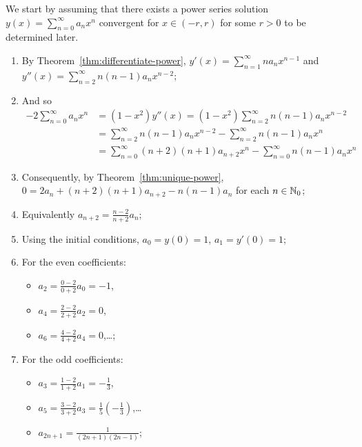\begin{solution}

  We start by assuming that there exists a power series solution \(y(x) = \sum_{n=0}^{\infty}a_n x^n\) convergent for \(x \in (-r,r)\) for some \(r>0\) to be determined later.
  \begin{enumerate}
    \item
          By Theorem~\ref{thm:differentiate-power}, \(y'(x) = \sum_{n=1}^{\infty}n a_n x^{n-1}\) and \(y''(x) = \sum_{n=2}^{\infty}n(n-1) a_n x^{n-2}\);
    \item And so
          \[
            \begin{aligned}
              -2 \sum_{n=0}^{\infty}a_n x^n
               & = (1-x^2)y''(x)
              = (1-x^2) \sum_{n=2}^{\infty}n(n-1) a_n x^{n-2}                                        \\
               & = \sum_{n=2}^{\infty}n(n-1) a_n x^{n-2} - \sum_{n=2}^{\infty}n(n-1) a_n x^{n}       \\
               & = \sum_{n=0}^{\infty}(n+2)(n+1) a_{n+2} x^{n} - \sum_{n=0}^{\infty}n(n-1) a_n x^{n}
            \end{aligned}
          \]
    \item Consequently, by Theorem~\ref{thm:unique-power}, \(0 = 2a_n +  (n+2)(n+1) a_{n+2} -  n(n-1) a_n \) for each \(n \in \mathbb{N}_0\);
    \item Equivalently \(a_{n+2} = \frac{n-2}{n+2}a_n\);
    \item Using the initial conditions,  \(a_0 = y(0) = 1\), \(a_1 = y'(0) = 1\);
    \item For the even coefficients:
          \begin{itemize}
            \item \(a_2 =  \frac{0-2}{0+2}a_0 = -1\),
            \item \(a_4 =  \frac{2-2}{2+2}a_2 = 0\),
            \item  \(a_6 =  \frac{4-2}{4+2}a_4 = 0\),\ldots;
          \end{itemize}
    \item For the odd coefficients:
          \begin{itemize}
            \item \(a_3 =  \frac{1-2}{1+2}a_1 = -\frac{1}{3}\),
            \item \(a_5= \frac{3-2}{3+2}a_3 = \frac{1}{5}(-\frac{1}{3})\),\ldots
            \item \(a_{2n+1} = \frac{1}{(2n+1)(2n-1)}\);
          \end{itemize}

\end{enumerate}
\end{solution}
